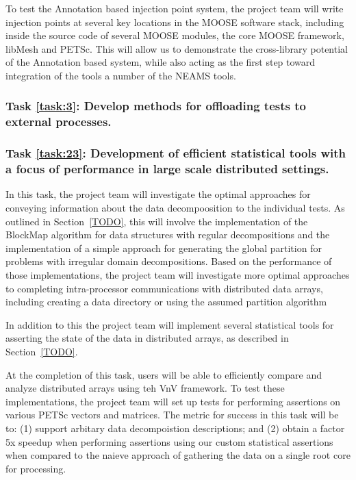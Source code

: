 To test the Annotation based injection point system, the project team will write injection points at several key locations in the MOOSE software stack, including inside the source code of several MOOSE modules, the core MOOSE framework, libMesh and PETSc. This will allow us to demonstrate the cross-library potential of the Annotation based system, while also acting as the first step toward integration of the tools a number of the NEAMS tools. 



\label{task:3}
\subsubsection{Task \ref{task:3}: Develop methods for offloading tests to external processes. }

\label{task:23}
\subsubsection{Task \ref{task:23}: Development of efficient statistical \VV tools with a focus of performance in large scale distributed settings.}


In this task, the project team will investigate the optimal approaches for conveying information about the data decompoosition to the individual tests. As outlined in Section~\ref{TODO}, this will involve the implementation of the BlockMap algorithm for data structures with regular decompositions and the implementation of a simple approach for generating the global partition for problems with irregular domain decompositions. Based on the performance of those implementations, the project team will investigate more optimal approaches to completing intra-processor communications with distributed data arrays, including creating a data directory or using the assumed partition algorithm 

In addition to this the project team will implement several statistical tools for asserting the state of the data in distributed arrays, as described in Section~\ref{TODO}. 

At the completion of this task, users will be able to efficiently compare and analyze distributed arrays using teh VnV framework. To test these implementations, the project team will set up tests for performing assertions on various PETSc vectors and matrices. The metric for success in this task will be to: (1) support arbitary data decompoistion descriptions; and (2) obtain a factor 5x speedup when performing assertions using our custom statistical assertions when compared to the naieve approach of gathering the data on a single root core for processing. 

